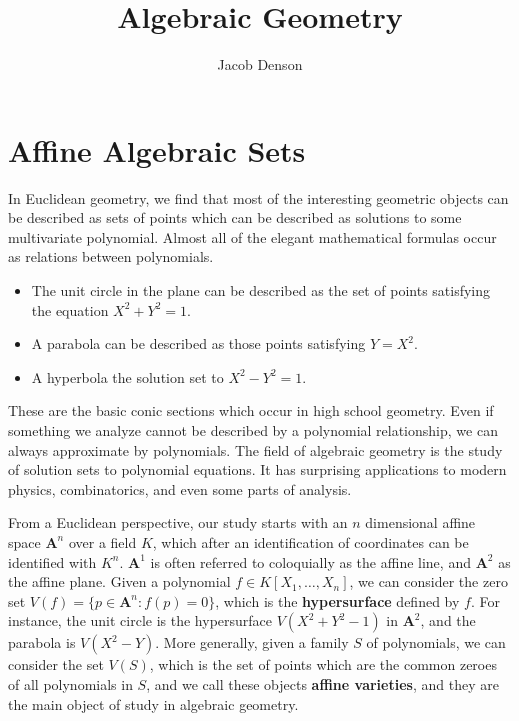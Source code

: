 

\title{Algebraic Geometry}
\author{Jacob Denson}



\maketitle
\tableofcontents
{}

\chapter{Affine Algebraic Sets}

In Euclidean geometry, we find that most of the interesting geometric objects can be described as sets of points which can be described as solutions to some multivariate polynomial. Almost all of the elegant mathematical formulas occur as relations between polynomials.
%
\begin{itemize}
    \item The unit circle in the plane can be described as the set of points satisfying the equation $X^2 + Y^2 = 1$.
    \item A parabola can be described as those points satisfying $Y = X^2$.
    \item A hyperbola the solution set to $X^2 - Y^2 = 1$.
\end{itemize}
%
These are the basic conic sections which occur in high school geometry. Even if something we analyze cannot be described by a polynomial relationship, we can always approximate by polynomials. The field of algebraic geometry is the study of solution sets to polynomial equations. It has surprising applications to modern physics, combinatorics, and even some parts of analysis.

From a Euclidean perspective, our study starts with an $n$ dimensional affine space $\mathbf{A}^n$ over a field $K$, which after an identification of coordinates can be identified with $K^n$. $\mathbf{A}^1$ is often referred to coloquially as the affine line, and $\mathbf{A}^2$ as the affine plane. Given a polynomial $f \in K[X_1, \dots, X_n]$, we can consider the zero set $V(f) = \{ p \in \mathbf{A}^n : f(p) = 0 \}$, which is the {\bf hypersurface} defined by $f$. For instance, the unit circle is the hypersurface $V(X^2 + Y^2 - 1)$ in $\mathbf{A}^2$, and the parabola is $V(X^2 - Y)$. More generally, given a family $S$ of polynomials, we can consider the set $V(S)$, which is the set of points which are the common zeroes of all polynomials in $S$, and we call these objects {\bf affine varieties}, and they are the main object of study in algebraic geometry. 

